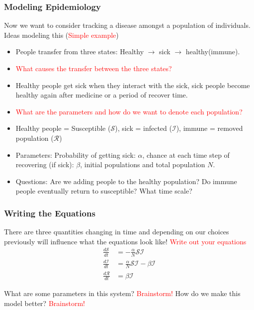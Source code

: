 \documentclass[serif]{beamer}
\begin{document}
\begin{frame}
\frametitle{Modeling Epidemiology} 

{\tiny
Now we want to consider tracking a disease amongst a population of individuals. Ideas modeling this (\textcolor{red}{Simple example})
}
\begin{itemize}
\item People transfer from three states: Healthy $\rightarrow$ sick $\rightarrow$ healthy(immune). 
\item \textcolor{red}{What causes the transfer between the three states?} 
\pause 
\item Healthy people get sick when they interact with the sick, sick people become healthy again after medicine or a period of recover time. 
\item \textcolor{red}{What are the parameters and how do we want to denote each population?} 
\pause 
\item Healthy people = Susceptible ($\mathcal{S}$), sick = infected ($\mathcal{I}$), immune = removed population ($\mathcal{R}$) 
\item Parameters: Probability of getting sick: $\alpha$, chance at each time step of recovering (if sick): $\beta$, initial populations and total population $N$.
\item Questions: Are we adding people to the healthy population? Do immune people eventually return to susceptible? What time scale? 
\end{itemize}


\end{frame}

\begin{frame}
\frametitle{Writing the Equations}

There are three quantities changing in time and depending on our choices previously will influence what the equations look like! \textcolor{red}{Write out your equations} 
\pause
\begin{align*}
\frac{d\mathcal{S}}{dt} &= -\frac{\alpha}{N}\mathcal{S}\mathcal{I}\\
\frac{d\mathcal{I}}{dt} &= \frac{\alpha}{N}\mathcal{S}\mathcal{I} - \beta\mathcal{I}\\
\frac{d\mathcal{R}}{dt} &= \beta\mathcal{I}
\end{align*}

What are some parameters in this system? \textcolor{red}{Brainstorm!} How do we make this model better? \textcolor{red}{Brainstorm!}

\end{frame}
\end{document}
